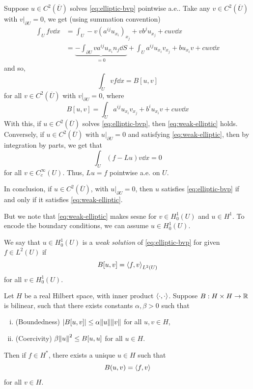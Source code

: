 \documentclass{article}
\begin{document}
Suppose \(u \in C^2(\overline U)\) solves \cref{eq:elliptic-bvp} pointwise a.e.. Take any \(v \in C^2(\overline U)\) with \(v\vert_{\partial U} = 0\), we get (using summation convention)
\begin{align*}
    \int_U f v \dd x &= \int_U -v(a^{ij}u_{x_i})_{x_j} + vb^j u_{x_j} + cuv \dd x \\
    &= \underbrace{-\int_{\partial U}va^{ij}u_{x_i}n_j \dd S}_{=0} + \int_U a^{ij}u_{x_i}v_{x_j} + bu_{x_i}v + cuv \dd x
\end{align*}
and so,
\begin{equation}
    \label{eq:weak-elliptic}
    \int_U vf \dd x = B[u, v]
\end{equation}
for all \(v \in C^2(\overline U)\) with \(v\vert_{\partial U} = 0\), where
\[B[u, v] = \int_U a^{ij}u_{x_i}v_{x_j} + b^iu_{x_i}v + cuv \dd x\]
With this, if \(u \in C^2(\overline U)\) solves \cref{eq:elliptic-bvp}, then \cref{eq:weak-elliptic} holds. Conversely, if \(u \in C^2(\overline U)\) with \(u\vert_{\partial U} = 0\) and satisfying \cref{eq:weak-elliptic}, then by integration by parts, we get that
\[\int_U (f - Lu)v \dd x = 0\]
for all \(v \in C_c^\infty(U)\). Thus, \(Lu = f\) pointwise a.e. on \(U\).

In conclusion, if \(u \in C^2(\overline U)\), with \(u\vert_{\partial U} = 0\), then \(u\) satisfies \cref{eq:elliptic-bvp} if and only if it satisfies \cref{eq:weak-elliptic}.

But we note that \cref{eq:weak-elliptic} makes sesne for \(v \in H_0^1(U)\) and \(u \in H^1\). To encode the boundary conditions, we can assume \(u \in H_0^1(U)\).

\begin{definition}
     We say that \(u \in H^1_0(U)\) is a \emph{weak solution} of \cref{eq:elliptic-bvp} for given \(f \in L^2(U)\) if
    \[B[u, v] = \left\langle f, v \right\rangle_{L^2(U)}\]
    for all \(v \in H_0^1(U)\).
\end{definition}

\begin{theorem}
     \label{thm:lax-milgram} Let \(H\) be a real Hilbert space, with inner product \(\left\langle \cdot, \cdot \right\rangle\). Suppose \(B : H \times H \to \mathbb{R}\) is bilinear, such that there exists constants \(\alpha, \beta > 0\) such that
    \begin{enumerate}[(i)]
        \item (Boundedness) \(\abs{B[u, v]} \le \alpha \norm{u}\norm{v}\) for all \(u, v \in H\), 
        \item (Coercivity) \(\beta\norm{u}^2 \le B[u, u]\) for all \(u \in H\).
    \end{enumerate}
    Then if \(f \in H^*\), there exists a unique \(u \in H\) such that
    \[B(u, v) = \left\langle f, v \right\rangle\]
    for all \(v \in H\).
\end{theorem}
\end{document}
